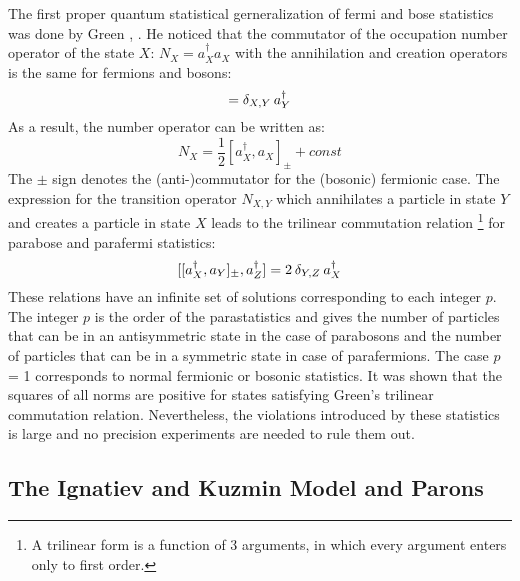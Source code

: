 The first proper quantum statistical gerneralization of fermi and bose statistics was done by Green \cite{Green1953}, \cite{Greenberg2000}. He noticed that the commutator of the occupation number operator of the state $X$: $N_{X} = a^{\dag}_{X} a_{X} $ with the annihilation and creation operators is the same for fermions and bosons:
\begin{equation}
 [N_{X},a^{\dag}_{Y}] = \delta_{X,Y} \hspace{0.2em} a^{\dag}_{Y}
\end{equation} 
As a result, the number operator can be written as:
\begin{equation}
 N_{X} = \frac{1}{2}[a^{\dag}_{X},a_{X}]_{\pm} + const
\end{equation} 
The $\pm$ sign denotes the (anti-)commutator for the (bosonic) fermionic case. The expression for the transition operator $N_{X,Y}$ which annihilates a particle in state $Y$ and creates a particle in state $X$ leads to the trilinear commutation relation \footnote{A trilinear form is a function of 3 arguments, in which every argument enters only to first order.} for parabose and parafermi statistics:
\begin{equation}
\label{eq:triComm}
 [[a^{\dag}_{X},a_{Y}]_{\pm},a_{Z}^{\dag}] = 2 \hspace{0.2em} \delta_{Y,Z} \hspace{0.2em} a_{X}^{\dag}
\end{equation} 
These relations have an infinite set of solutions corresponding to each integer $p$. The integer $p$ is the order of the parastatistics and gives the number of particles that can be in an antisymmetric state in the case of parabosons and the number of particles that can be in a symmetric state in case of parafermions. The case $p$ = 1 corresponds to normal fermionic or bosonic statistics. It was shown that the squares of all norms are positive for states satisfying Green's trilinear commutation relation. Nevertheless, the violations introduced by these statistics is large and no precision experiments are needed to rule them out.

\subsection{The Ignatiev and Kuzmin Model and Parons}

